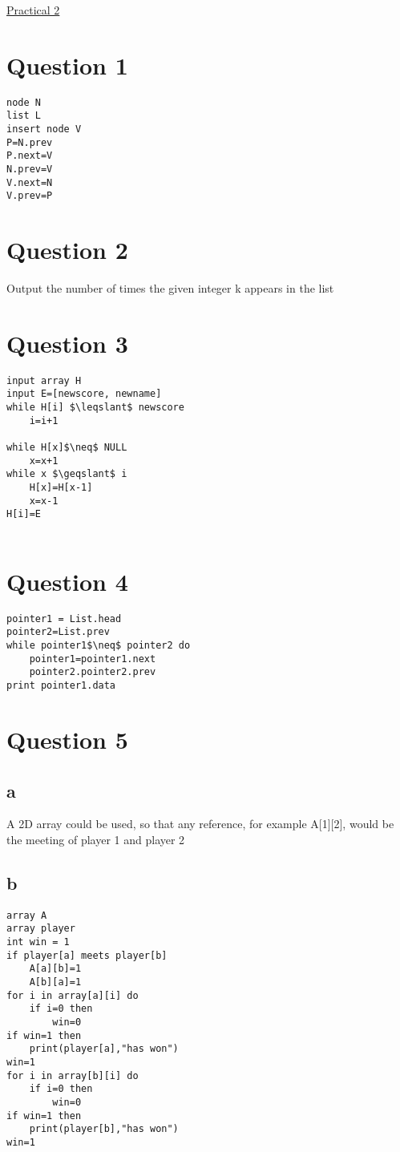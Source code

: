 \documentclass{article}[18pt]
\begin{document}
\begin{center}
\underline{\huge Practical 2}
\end{center}
\section{Question 1}
\begin{lstlisting}[mathescape=true]
node N
list L
insert node V	
P=N.prev
P.next=V
N.prev=V
V.next=N
V.prev=P

\end{lstlisting}

\section{Question 2}
Output the number of times the given integer k appears in the list
\section{Question 3}
\begin{lstlisting}[mathescape=true]
input array H
input E=[newscore, newname]
while H[i] $\leqslant$ newscore
	i=i+1
	
while H[x]$\neq$ NULL
	x=x+1
while x $\geqslant$ i
	H[x]=H[x-1]
	x=x-1
H[i]=E		
		
\end{lstlisting}
\section{Question 4}
\begin{lstlisting}[mathescape=true]
pointer1 = List.head
pointer2=List.prev
while pointer1$\neq$ pointer2 do
	pointer1=pointer1.next
	pointer2.pointer2.prev
print pointer1.data

\end{lstlisting}
\section{Question 5}
\subsection{a}
A 2D array could be used, so that any reference, for example A[1][2], would be the meeting of player 1 and player 2
\newpage
\subsection{b}
\begin{lstlisting}[mathescape=true]
array A
array player
int win = 1
if player[a] meets player[b]
	A[a][b]=1
	A[b][a]=1
for i in array[a][i] do
	if i=0 then
		win=0
if win=1 then
	print(player[a],"has won")
win=1
for i in array[b][i] do
	if i=0 then
		win=0
if win=1 then
	print(player[b],"has won")
win=1

\end{lstlisting}
\end{document}
